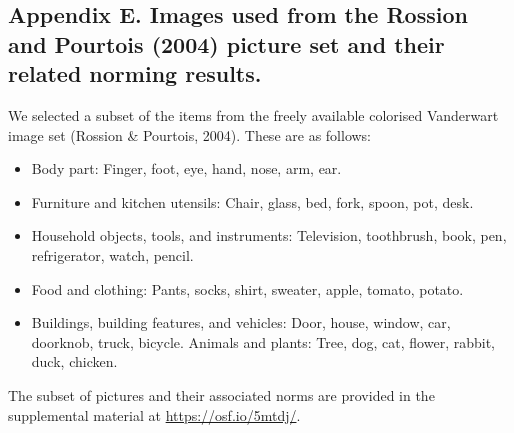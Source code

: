 \documentclass[doc,floatsintext]{apa6}
\begin{document}
\begin{appendix}
\section{}
\subsection{Appendix E. Images used from the Rossion and Pourtois (2004)
picture set and their related norming results.}\label{appendix-d}

We selected a subset of the items from the freely available colorised
Vanderwart image set (Rossion \& Pourtois, 2004). These are as follows:

\begin{itemize}
\item
  Body part: Finger, foot, eye, hand, nose, arm, ear.
\item
  Furniture and kitchen utensils: Chair, glass, bed, fork, spoon, pot,
  desk.
\item
  Household objects, tools, and instruments: Television, toothbrush,
  book, pen, refrigerator, watch, pencil.
\item
  Food and clothing: Pants, socks, shirt, sweater, apple, tomato,
  potato.
\item
  Buildings, building features, and vehicles: Door, house, window, car,
  doorknob, truck, bicycle. Animals and plants: Tree, dog, cat, flower,
  rabbit, duck, chicken.
\end{itemize}

The subset of pictures and their associated norms are provided in the
supplemental material at \url{https://osf.io/5mtdj/}.
\end{appendix}
\end{document}
